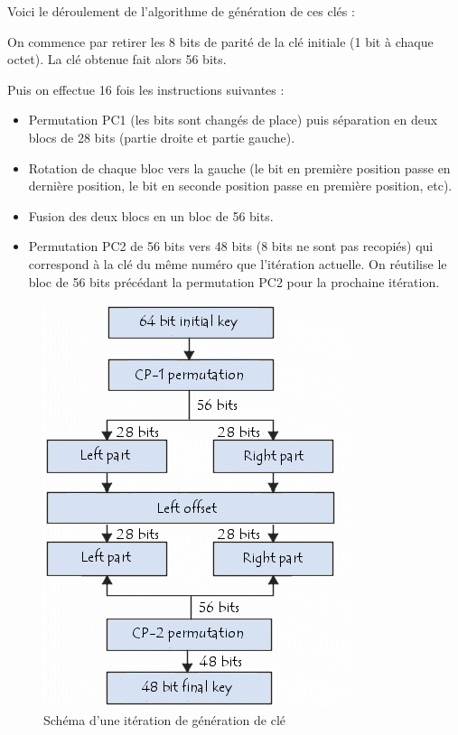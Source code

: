\documentclass[a4paper,12pt]{article}
\begin{document}
Voici le déroulement de l'algorithme de génération de ces clés :
	
On commence par retirer les 8 bits de parité de la clé initiale (1 bit à chaque octet). La clé obtenue fait alors 56 bits.

Puis on effectue 16 fois les instructions suivantes :

\begin{itemize}
\item Permutation PC1 (les bits sont changés de place) puis séparation en deux blocs de 28 bits (partie droite et partie gauche).
\item Rotation de chaque bloc vers la gauche (le bit en première position passe en dernière position, le bit en seconde position passe en première position, etc).
\item Fusion des deux blocs en un bloc de 56 bits.
\item Permutation PC2 de 56 bits vers 48 bits (8 bits ne sont pas recopiés) qui correspond à la clé du même numéro que l'itération actuelle. On réutilise le bloc de 56 bits précédant la permutation PC2 pour la prochaine itération.
\end{itemize}

\begin{figure}[h]
\centering
\includegraphics[scale=0.80]{./images/keygen.png}
\caption{Schéma d'une itération de génération de clé}
\label{fig:keygen}
\end{figure}
\end{document}
